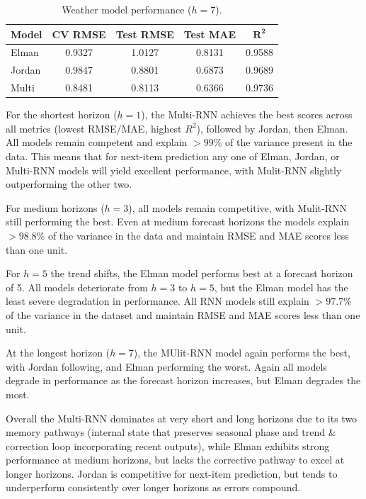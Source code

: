\documentclass[conference]{IEEEtran}
\begin{document}
\begin{table}[H]
\centering
\caption{Weather model performance ($h=7$).}
\label{tab:wx_h7}
\begin{tabular}{lcccc}
\toprule
\textbf{Model} & \textbf{CV RMSE} & \textbf{Test RMSE} & \textbf{Test MAE} & $\mathbf{R^2}$ \\
\midrule
Elman  & 0.9327 & 1.0127 & 0.8131 & 0.9588 \\
Jordan & 0.9847 & 0.8801 & 0.6873 & 0.9689 \\
Multi  & 0.8481 & 0.8113 & 0.6366 & 0.9736 \\
\bottomrule
\end{tabular}
\end{table}

For the shortest horizon ($h=1$), the Multi-RNN achieves the best scores across all metrics (lowest RMSE/MAE, highest $R^2$), followed by Jordan, then Elman. All models remain competent and explain $> 99\%$ of the variance present in the data. This means that for next-item prediction any one of Elman, Jordan, or Multi-RNN models will yield excellent performance, with Mulit-RNN slightly outperforming the other two.

For medium horizons ($h=3$), all models remain competitive, with Mulit-RNN still performing the best. Even at medium forecast horizons the models explain $>98.8\%$ of the variance in the data and maintain RMSE and MAE scores less than one unit.

For $h=5$ the trend shifts, the Elman model performs best at a forecast horizon of 5. All models deteriorate from $h=3$ to $h=5$, but the Elman model has the least severe degradation in performance. All RNN models still explain $> 97.7\%$ of the variance in the dataset and maintain RMSE and MAE scores less than one unit.

At the longest horizon ($h=7$), the MUlit-RNN model again performs the best, with Jordan following, and Elman performing the worst. Again all models degrade in performance as the forecast horizon increases, but Elman degrades the most.

Overall the Multi-RNN dominates at very short and long horizons due to its two memory pathways (internal state that preserves seasonal phase and trend \& correction loop incorporating recent outputs), while Elman exhibits strong performance at medium horizons, but lacks the corrective pathway to excel at longer horizons. Jordan is competitive for next-item prediction, but tends to underperform consistently over longer horizons as errors compound.
\end{document}
